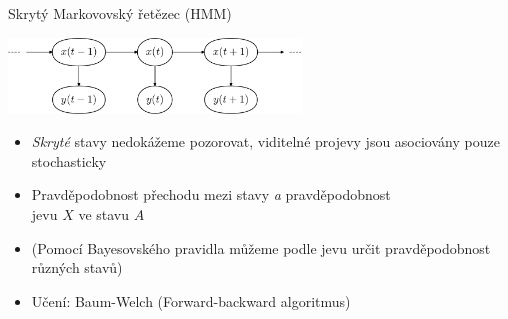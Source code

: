 \documentclass{beamer}
\begin{document}
\subsection{}
\begin{frame}{Skrytý Markovovský řetězec (HMM)}
\begin{center}
\includegraphics[height=2cm]{Hmm_temporal_bayesian_net.pdf}
\end{center}

\begin{itemize}
\item {\em Skryté} stavy nedokážeme pozorovat, viditelné projevy jsou asociovány pouze stochasticky
\item Pravděpodobnost přechodu mezi stavy {\em a} pravděpodobnost \\ jevu $X$ ve stavu $A$
\item (Pomocí Bayesovského pravidla můžeme podle jevu určit pravděpodobnost různých stavů)
\item Učení: Baum-Welch (Forward-backward algoritmus)
\end{itemize}
\end{frame}
\end{document}
